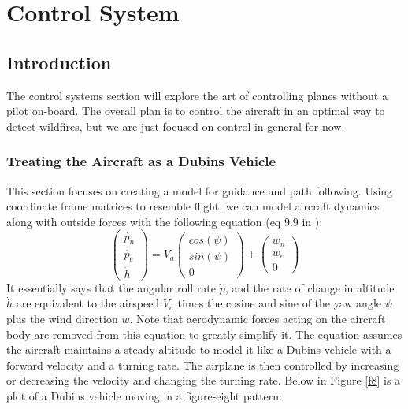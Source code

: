 \documentclass[12pt,journal,compsoc]{IEEEtran}
\begin{document}
\section{Control System}
\subsection{Introduction}
The control systems section will explore the art of controlling planes without a pilot on-board. The overall plan is to control the aircraft in an optimal way to detect wildfires, but we are just focused on control in general for now.

\subsubsection{Treating the Aircraft as a Dubins Vehicle}
This section focuses on creating a model for guidance and path following. Using coordinate frame matrices to resemble flight, we can model aircraft dynamics along with outside forces with the following equation (eq 9.9 in \cite{S-U-A}):
\[ \begin{pmatrix}
\dot{p_n} \\
\dot{p_e} \\
\dot{h}
\end{pmatrix} 
= V_a \begin{pmatrix}
cos(\psi) \\
sin(\psi) \\
0
\end{pmatrix}
+ \begin{pmatrix}
w_n \\
w_e \\
0
\end{pmatrix}
\]
It essentially says that the angular roll rate $\dot{p}$, and the rate of change in altitude $\dot{h}$ are equivalent to the airspeed $V_a$ times the cosine and sine of the yaw angle $\psi$ plus the wind direction $w$. Note that aerodynamic forces acting on the aircraft body are removed from this equation to greatly simplify it. The equation assumes the aircraft maintains a steady altitude to model it like a Dubins vehicle with a forward velocity and a turning rate. The airplane is then controlled by increasing or decreasing the velocity and changing the turning rate. Below in Figure \ref{f8} is a plot of a Dubins vehicle moving in a figure-eight pattern:
\end{document}
